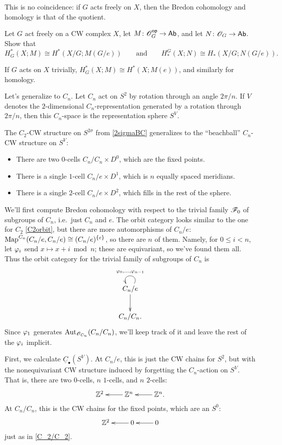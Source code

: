 This is no coincidence: if $G$ acts freely on $X$, then the Bredon cohomology and homology is that of the quotient.
\begin{ex}
Let $G$ act freely on a CW complex $X$, let $M\colon\mathscr O_G^{\mathsf{op}}\to\mathsf{Ab}$, and let $N\colon\mathscr O_G\to\mathsf{Ab}$. Show that
\[H_G^*(X;M) \cong H^*(X/G; M(G/e))\qquad\text{and}\qquad H^G_*(X; N)\cong H_*(X/G; N(G/e)).\]
\end{ex}
\begin{cor}
If $G$ acts on $X$ trivially, $H_G^*(X;M)\cong H^*(X; M(e))$, and similarly for homology.
\end{cor}
\begin{exm}
Let's generalize to $C_n$. Let $C_n$ act on $S^2$ by rotation through an angle $2\pi/n$. If $V$ denotes the
$2$-dimensional $C_n$-representation generated by a rotation through $2\pi/n$, then this $C_n$-space is the
representation sphere $S^V$.

The $C_2$-CW structure on $S^{2\sigma}$ from \cref{2sigmaBC} generalizes to the ``beachball'' $C_n$-CW structure on
$S^V$:
\begin{itemize}
	\item There are two $0$-cells $C_n/C_n\times D^0$, which are the fixed points.
	\item There is a single $1$-cell $C_n/e\times D^1$, which is $n$ equally spaced meridians.
	\item There is a single $2$-cell $C_n/e\times D^2$, which fills in the rest of the sphere.
\end{itemize}
We'll first compute Bredon cohomology with respect to the trivial family $\mathscr F_0$ of subgroups of $C_n$, i.e.\ just
$C_n$ and $e$. The orbit category looks similar to the one for $C_2$ \eqref{C2orbit}, but there are more
automorphisms of $C_n/e$: $\operatorname{Map}^{C_n}(C_n/e, C_n/e)\cong (C_n/e)^{\{e\}}$, so there are $n$ of them. Namely, for
$0\le i < n$, let $\varphi_i$ send $x\mapsto x+i\bmod n$; these are equivariant, so we've found them all. Thus the
orbit category for the trivial family of subgroups of $C_n$ is
\[\xymatrix{
	C_n/e\ar[d]\ar@(ur,ul)_{\vp_0,\dotsc,\vp_{n-1}}\\
	C_n/C_n.
}\]
Since $\varphi_1$ generates $\operatorname{Aut}_{\mathscr O_{C_n}}(C_n/C_n)$, we'll keep track of it and leave the rest of the $\varphi_i$
implicit.

First, we calculate $\underline C_\bullet(S^V)$. At $C_n/e$, this is just the CW chains for $S^2$, but with the
nonequivariant CW structure induced by forgetting the $C_n$-action on $S^V$. That is, there are two $0$-cells, $n$
$1$-cells, and $n$ $2$-cells:
\[\xymatrix{
	\Z^2 & \Z^n\ar[l] & \Z^n.\ar[l]
}\]
At $C_n/C_n$, this is the CW chains for the fixed points, which are an $S^0$:
\[\xymatrix{
	\Z^2 & 0\ar[l] & 0\ar[l]
}\]
just as in \eqref{C_2/C_2}.


\end{exm}
